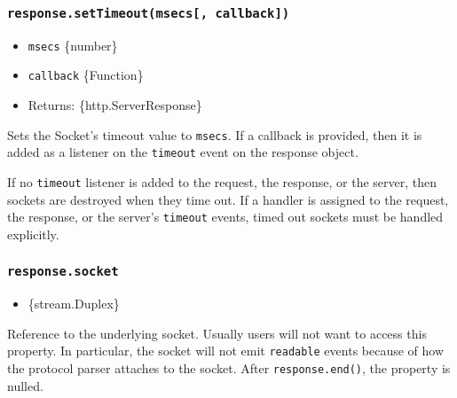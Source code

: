 \subsubsection{\texorpdfstring{\texttt{response.setTimeout(msecs{[},\ callback{]})}}{response.setTimeout(msecs{[}, callback{]})}}\label{response.settimeoutmsecs-callback}

\begin{itemize}
\tightlist
\item
  \texttt{msecs} \{number\}
\item
  \texttt{callback} \{Function\}
\item
  Returns: \{http.ServerResponse\}
\end{itemize}

Sets the Socket's timeout value to \texttt{msecs}. If a callback is
provided, then it is added as a listener on the
\texttt{\textquotesingle{}timeout\textquotesingle{}} event on the
response object.

If no \texttt{\textquotesingle{}timeout\textquotesingle{}} listener is
added to the request, the response, or the server, then sockets are
destroyed when they time out. If a handler is assigned to the request,
the response, or the server's
\texttt{\textquotesingle{}timeout\textquotesingle{}} events, timed out
sockets must be handled explicitly.

\subsubsection{\texorpdfstring{\texttt{response.socket}}{response.socket}}\label{response.socket}

\begin{itemize}
\tightlist
\item
  \{stream.Duplex\}
\end{itemize}

Reference to the underlying socket. Usually users will not want to
access this property. In particular, the socket will not emit
\texttt{\textquotesingle{}readable\textquotesingle{}} events because of
how the protocol parser attaches to the socket. After
\texttt{response.end()}, the property is nulled.


